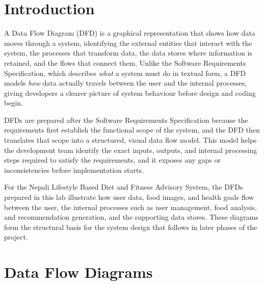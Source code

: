 \documentclass[12pt,a4paper]{report}
\begin{document}
\tableofcontents
\newpage
{}
\setcounter{page}{1}

\chapter{Introduction}

A Data Flow Diagram (DFD) is a graphical representation that shows how data moves through a
system, identifying the external entities that interact with the system, the processes that
transform data, the data stores where information is retained, and the flows that connect them.
Unlike the Software Requirements Specification, which describes \emph{what} a system must do
in textual form, a DFD models \emph{how} data actually travels between the user and the
internal processes, giving developers a clearer picture of system behaviour before design and
coding begin.

DFDs are prepared after the Software Requirements Specification because the requirements first
establish the functional scope of the system, and the DFD then translates that scope into a
structured, visual data flow model. This model helps the development team identify the exact
inputs, outputs, and internal processing steps required to satisfy the requirements, and it
exposes any gaps or inconsistencies before implementation starts.

For the Nepali Lifestyle Based Diet and Fitness Advisory System, the DFDs prepared in this lab
illustrate how user data, food images, and health goals flow between the user, the internal
processes such as user management, food analysis, and recommendation generation, and the
supporting data stores. These diagrams form the structural basis for the system design that
follows in later phases of the project.

\chapter{Data Flow Diagrams}
\end{document}
